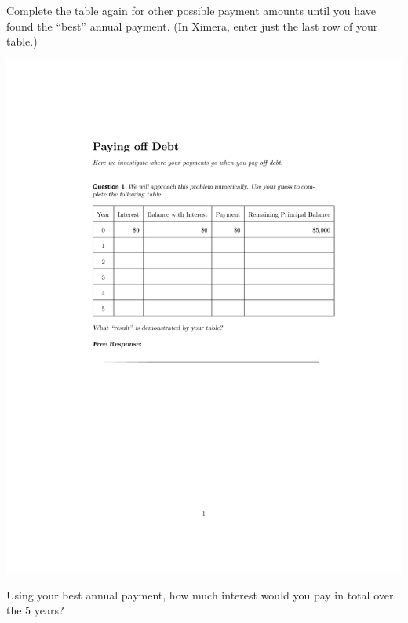 \documentclass[handout,space,nooutcomes]{ximera}
\begin{document}
\begin{question}[0in]
Complete the table again for other possible payment amounts until you have found the ``best'' annual payment.  (In Ximera, enter just the last row of your table.)

\includegraphics{payingOffDebtTableGraphic.pdf}

\begin{freeResponse}
\end{freeResponse}
\end{question}

\begin{question}
Using your best annual payment, how much interest would you pay in total over the $5$ years? 
\begin{freeResponse}
\end{freeResponse}
\end{question}
\end{document}
